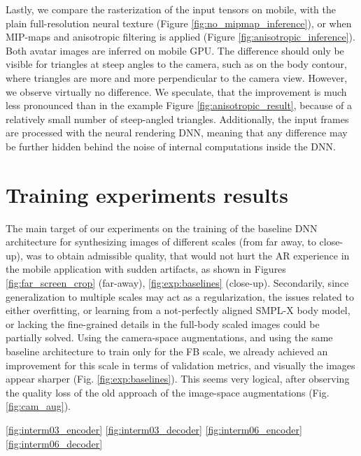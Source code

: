 Lastly, we compare the rasterization of the input tensors on mobile, with the plain full-resolution neural texture (Figure \ref{fig:no_mipmap_inference}), or when MIP-maps and anisotropic filtering is applied (Figure \ref{fig:anisotropic_inference}). Both avatar images are inferred on mobile GPU. The difference should only be visible for triangles at steep angles to the camera, such as on the body contour, where triangles are more and more perpendicular to the camera view. However, we observe virtually no difference. We speculate, that the improvement is much less pronounced than in the example Figure \ref{fig:anisotropic_result}, because of a relatively small number of steep-angled triangles. Additionally, the input frames are processed with the neural rendering  DNN, meaning that any difference may be further hidden behind the noise of internal computations inside the DNN.

\section{Training experiments results}\label{res:training}

The main target of our experiments on the training of the baseline DNN architecture for synthesizing images of different scales (from far away, to close-up), was to obtain admissible quality, that would not hurt the AR experience in the mobile application with sudden artifacts, as shown in Figures \ref{fig:far_screen_crop} (far-away), \ref{fig:exp:baselines} (close-up). Secondarily, since generalization to multiple scales may act as a regularization, the issues related to either overfitting, or learning from a not-perfectly aligned SMPL-X body model, or lacking the fine-grained details in the full-body scaled images could be partially solved. Using the camera-space augmentations, and using the same baseline architecture to train only for the FB scale, we already achieved an improvement for this scale in terms of validation metrics, and visually the images appear sharper (Fig. \ref{fig:exp:baselines}). This seems very logical, after observing the quality loss of the old approach of the image-space augmentations (Fig. \ref{fig:cam_aug}).
 
\ref{fig:interm03_encoder} \ref{fig:interm03_decoder} \ref{fig:interm06_encoder} \ref{fig:interm06_decoder}


